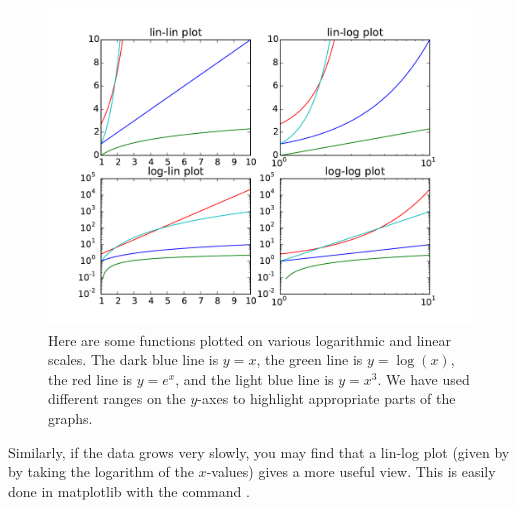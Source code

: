 \begin{figure}
\centering
\includegraphics[width=\textwidth]{log_plots.pdf}
\caption{Here are some functions plotted on various logarithmic and linear scales. 
The dark blue line is $y=x$, the green line is $y=\log(x)$, the red line is $y=e^x$, and the light blue line is $y=x^3$. 
We have used different ranges on the $y$-axes to highlight appropriate parts of the graphs.}
\label{fig:log_plots}
\end{figure}


Similarly, if the data grows very slowly, you may find that a lin-log plot (given by by taking the logarithm of the $x$-values) gives a more useful view.
This is easily done in matplotlib with the command .

